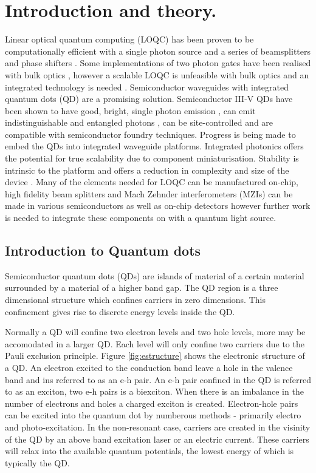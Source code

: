 
\chapter{Introduction and theory.}

Linear optical quantum computing (LOQC) has been proven to be computationally
efficient with a single photon source and a series of beamsplitters and phase
shifters \cite{knill2001scheme}. Some implementations of two photon gates have
been realised with bulk optics \cite{o2003demonstration}, however a scalable
LOQC is unfeasible with bulk optics and an integrated technology is needed
\cite{carolan2015universal}. Semiconductor waveguides with integrated quantum
dots (QD) are a promising solution. Semiconductor III-V QDs have been shown to
have good, bright, single photon emission \cite{Bennett:05}, can emit
indistinguishable and entangled photons \cite{he2013demand,stevenson2012}, can
be site-controlled \cite{juska2013towards} and are compatible with semiconductor
foundry techniques. Progress is being made to embed the QDs into integrated
waveguide platforms. Integrated photonics offers the potential for true
scalability due to component miniaturisation. Stability is intrinsic to the
platform and offers a reduction in complexity and size of the device
\cite{politi2009integrated}. Many of the elements needed for LOQC can be
manufactured on-chip, high fidelity beam splitters and Mach Zehnder
interferometers (MZIs) can be made in various semiconductors
\cite{wang2014gallium, zhang2011, politi2008silica} as well as on-chip detectors
\cite{gerrits2011chip, hadfield2009single} however further work is needed to
integrate these components on with a quantum light source.

\section{Introduction to Quantum dots}

Semiconductor quantum dots (QDs) are islands of material of a certain material
surrounded by a material of a higher band gap. The QD region is a three
dimensional structure which confines carriers in zero dimensions. This
confinement gives rise to discrete energy levels inside the QD.

Normally a QD will confine two electron levels and two hole levels, more may be
accomodated in a larger QD. Each level will only confine two carriers due to the
Pauli exclusion principle. Figure \ref{fig:estructure} shows the electronic
structure of a QD. An electron excited to the conduction band leave a hole in
the valence band and ins referred to as an e-h pair. An e-h pair confined in the
QD is referred to as an exciton, two e-h pairs is a biexciton. When there is an
imbalance in the number of electrons and holes a charged exciton is created.
Electron-hole pairs can be excited into the quantum dot by numberous methods -
primarily electro and photo-excitation. In the non-resonant case, carriers are
created in the visinity of the QD by an above band excitation laser or an
electric current. These carriers will relax into the available quantum
potentials, the lowest energy of which is typically the QD.

